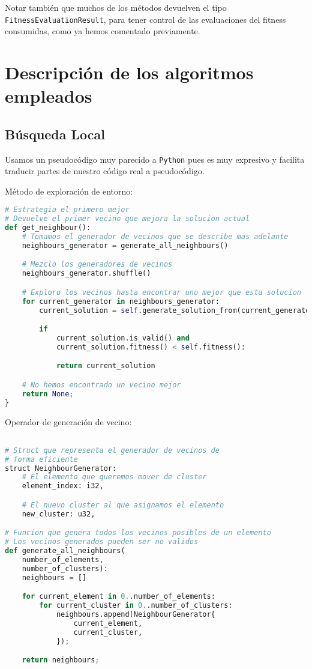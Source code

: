 \documentclass[11pt]{article}
\begin{document}
Notar también que muchos de los métodos devuelven el tipo \lstinline{FitnessEvaluationResult}, para tener control de las evaluaciones del fitness consumidas, como ya hemos comentado previamente.

\pagebreak

\section{Descripción de los algoritmos empleados}

\subsection{Búsqueda Local}

Usamos un pseudocódigo muy parecido a \lstinline{Python} pues es muy expresivo y facilita traducir partes de nuestro código real a pseudocódigo.

Método de exploración de entorno:

\begin{lstlisting}[language=Python, style=Boxed]
# Estrategia el primero mejor
# Devuelve el primer vecino que mejora la solucion actual
def get_neighbour():
    # Tomamos el generador de vecinos que se describe mas adelante
    neighbours_generator = generate_all_neighbours()

    # Mezclo los generadores de vecinos
    neighbours_generator.shuffle()

    # Exploro los vecinos hasta encontrar uno mejor que esta solucion
    for current_generator in neighbours_generator:
        current_solution = self.generate_solution_from(current_generator)

        if
            current_solution.is_valid() and
            current_solution.fitness() < self.fitness():

            return current_solution

    # No hemos encontrado un vecino mejor
    return None;
}
\end{lstlisting}

Operador de generación de vecino:

\begin{lstlisting}[language=Python, style=Boxed]

# Struct que representa el generador de vecinos de
# forma eficiente
struct NeighbourGenerator:
    # El elemento que queremos mover de cluster
    element_index: i32,

    # El nuevo cluster al que asignamos el elemento
    new_cluster: u32,

# Funcion que genera todos los vecinos posibles de un elemento
# Los vecinos generados pueden ser no validos
def generate_all_neighbours(
    number_of_elements,
    number_of_clusters):
    neighbours = []

    for current_element in 0..number_of_elements:
        for current_cluster in 0..number_of_clusters:
            neighbours.append(NeighbourGenerator{
                current_element,
                current_cluster,
            });

    return neighbours;
\end{lstlisting}
\end{document}
